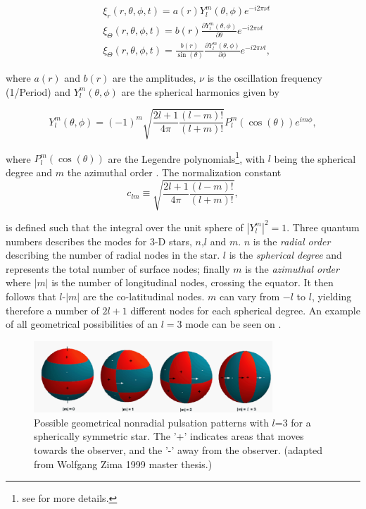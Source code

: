 \begin{align}
    & \xi_r(r,\theta,\phi,t) = a(r)Y^{m}_l(\theta,\phi)e^{-i2\pi\nu t}  \\
    & \xi_\Theta(r,\theta,\phi,t) = b(r)\frac{\partial Y^{m}_l(\theta,\phi)}{\partial \theta}e^{-i2\pi\nu t}  \\
    & \xi_\Theta(r,\theta,\phi,t) = \frac{b(r)}{\sin(\theta)}\frac{\partial Y^{m}_l(\theta,\phi)}{\partial \phi}e^{-i2\pi\nu t},
\end{align}

\noindent where $a(r)$ and $b(r)$ are the amplitudes, $\nu$ is the oscillation frequency (1/Period) and $Y^{m}_l(\theta,\phi)$ are the spherical harmonics given by 

\begin{equation}
\label{spherical}
    Y^{m}_l(\theta,\phi) = (-1)^{m}\sqrt{\frac{2l+1}{4\pi}\frac{(l-m)!}{(l+m)!}}P^{m}_l(\cos(\theta))e^{im\phi},
\end{equation}

\noindent where $P^{m}_l(\cos(\theta))$ are the Legendre polynomials\footnote{see \citet{aerts2010} for more details.}, with $l$ being the spherical degree and $m$ the azimuthal order . The normalization constant 
\begin{equation}
    c_{lm} \equiv \sqrt{\frac{2l+1}{4\pi}\frac{(l-m)!}{(l+m)!}},
\end{equation}

\noindent is defined such that the integral over the unit sphere of $|Y^{m}_l|^2 = 1 $. Three quantum numbers describes the modes for 3-D stars, $n$,$l$ and $m$. $n$ is the \textit{radial order} describing the number of radial nodes in the star. $l$ is the \textit{spherical degree} and represents the total number of surface nodes; finally $m$ is the \textit{azimuthal order} where $|m|$ is the number of longitudinal nodes, crossing the equator. It then follows that $l$-$|m|$ are the co-latitudinal nodes. $m$ can vary from $-l$ to $l$, yielding therefore a number of $2l+1$ different nodes for each spherical degree. An example of all geometrical possibilities of an $l=3$ mode can be seen on . 

\begin{figure}[t]
    \centering
    \includegraphics[width=0.8\textwidth]{nonradial.png}
    \caption{Possible geometrical nonradial pulsation patterns with $l$=3 for a spherically symmetric star. The '+' indicates areas that moves towards the observer, and the '-' away from the observer. \citep{antoci2011excitation} (adapted from Wolfgang Zima 1999 master thesis.)}
    \label{l3}
\end{figure}

